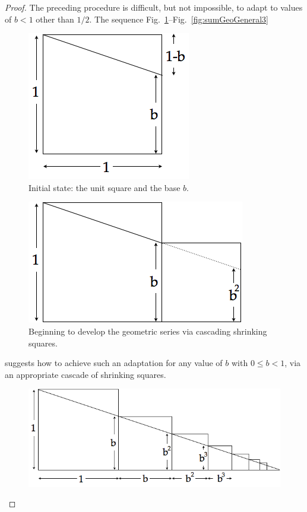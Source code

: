 \begin{proof}
\bigskip

The preceding procedure is difficult, but not impossible, to adapt to values of $b <1$ other than $1/2$.  The sequence Fig.~\ref{fig:sumGeoGeneral1}--Fig.~\ref{fig:sumGeoGeneral3}
\begin{figure}[htb]
\begin{center}
       \includegraphics[scale=0.35]{FiguresMaths/SumGeometricGeneral1}
\caption{Initial state: the unit square and the base $b$.}
       \label{fig:sumGeoGeneral1}
\end{center}
\end{figure}
\begin{figure}[htb]
\begin{center}
       \includegraphics[scale=0.35]{FiguresMaths/SumGeometricGeneral2}
\caption{Beginning to develop the geometric series via cascading shrinking squares.}
       \label{fig:sumGeoGeneral2}
\end{center}
\end{figure}
suggests how to achieve such an adaptation for any value of $b$ with $0 \leq b <1$, via an appropriate cascade of shrinking squares.
\begin{figure}[ht]
\begin{center}
       \includegraphics[scale=0.35]{FiguresMaths/SumGeometricGeneral3}

\end{center}
\end{figure}
\end{proof}

